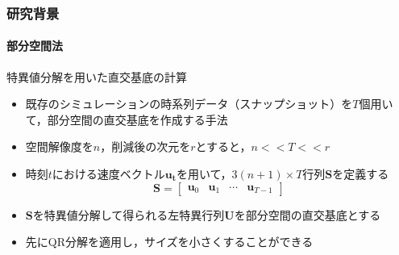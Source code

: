 \documentclass[aspectratio=169,dvipdfmx,hyperref={bookmarks=true}]{beamer}
\begin{document}
   \begin{frame}
  \frametitle{研究背景}
    \framesubtitle{部分空間法}
   \begin{block}{特異値分解を用いた直交基底の計算}
   \begin{itemize}
   \item 既存のシミュレーションの時系列データ（スナップショット）を$T$個用いて，部分空間の直交基底を作成する手法
\item 空間解像度を$n$，削減後の次元を$r$とすると，$n <\!< T <\!< r$ 
\item 時刻$t$における速度ベクトル$\bm{u_t}$を用いて，$3(n+1)\times T$行列$\bm{S}$を定義する
	 \[ \bm{S} = 
        		\begin{bmatrix}
   \bm{u}_0 & \bm{u}_1 &\cdots  & \bm{u}_{T-1}
\end{bmatrix}
\]
\item $\bm{S}$を特異値分解して得られる左特異行列$\bm{U}$を部分空間の直交基底とする
\item 先にQR分解を適用し，サイズを小さくすることができる
\end{itemize}
\end{block}

 \end{frame}
 
\end{document}

